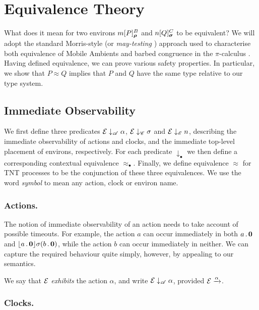 \documentclass[orivec,envcountsame]{llncs}
\newcommand{\Exhibits}[1]{\mathrel{\downarrow_{#1}}}
\newcommand{\ExhibitsA}{\Exhibits{\mathscr{A}}}
\newcommand{\ExhibitsC}{\Exhibits{\mathscr{C}}}
\newcommand{\ExhibitsE}{\Exhibits{\mathscr{E}}}
\newcommand{\Eq}{\approx}
\newcommand{\Does}[1]{\xderives{#1}}
\begin{document}
\section{Equivalence Theory}
\label{sec:equivalence-theory}

What does it mean for two environs $\locv{m}{P}{B}{\vec\rho}$ and
$\locv{n}{Q}{C}{\vec\sigma}$ to be equivalent? We will adopt the standard Morris-style  \cite{Mor68} (or \emph{may-testing} \cite{DNH84}) approach used to characterise
both equivalence of Mobile Ambients \cite{GC99} and barbed congruence in the
$\pi$-calculus \cite{sangiorgi:book}. Having defined equivalence, we can prove various
safety properties. In particular, we show that $P \Eq Q$ implies that $P$ and
$Q$ have the same type relative to our type system.

\subsection{Immediate Observability}
\label{sec:immediate-observability}

We first define three predicates $\expr \ExhibitsA \alpha$, $\expr \ExhibitsC
\sigma$ and $\expr \ExhibitsE n$, describing the immediate observability of
actions and clocks, and the immediate top-level placement of environs,
respectively. For each predicate $\Exhibits{\bullet}$ we then define a
corresponding contextual equivalence $\Eq_{\bullet}$. Finally, we define
equivalence $\Eq$ for TNT processes to be the conjunction of these three
equivalences. We use the word \emph{symbol} to mean any action, clock or environ
name.

\subsubsection{Actions.}
The notion of immediate observability of an action needs to take account
of possible timeouts. For example, the action $a$ can occur immediately
in both $a\,.\,\textbf{0}$ and $\lfloor{a\,.\,\textbf{0}}\rfloor {\sigma} ({b\,.\,\textbf{0}})$,
while the action $b$ can occur immediately in neither. We can capture
the required behaviour quite simply, however, by appealing to our
semantics.

\begin{definition}
We say that $\text{$\mathcal{E}$}$ \emph{exhibits} the action $\alpha$, and write
$\expr \ExhibitsA \alpha$, provided $\expr \Does{\alpha}$.
\end{definition}


\subsubsection{Clocks.} 
\end{document}
